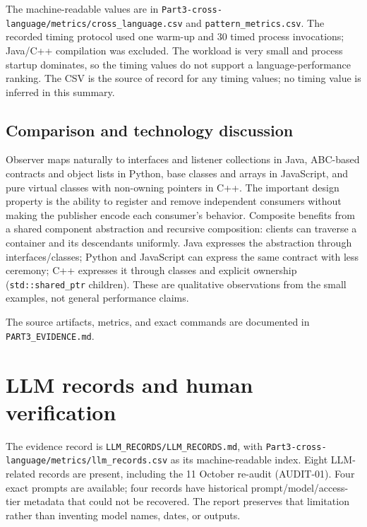 \documentclass[11pt,a4paper]{article}
\newcommand{\code}[1]{\nolinkurl{#1}}
\begin{document}
The machine-readable values are in \code{Part3-cross-language/metrics/cross_language.csv} and \code{pattern_metrics.csv}. The recorded timing protocol used one warm-up and 30 timed process invocations; Java/C++ compilation was excluded. The workload is very small and process startup dominates, so the timing values do not support a language-performance ranking. The CSV is the source of record for any timing values; no timing value is inferred in this summary.

\subsection{Comparison and technology discussion}
Observer maps naturally to interfaces and listener collections in Java, ABC-based contracts and object lists in Python, base classes and arrays in JavaScript, and pure virtual classes with non-owning pointers in C++. The important design property is the ability to register and remove independent consumers without making the publisher encode each consumer's behavior. Composite benefits from a shared component abstraction and recursive composition: clients can traverse a container and its descendants uniformly. Java expresses the abstraction through interfaces/classes; Python and JavaScript can express the same contract with less ceremony; C++ expresses it through classes and explicit ownership (\code{std::shared_ptr} children). These are qualitative observations from the small examples, not general performance claims.

The source artifacts, metrics, and exact commands are documented in \code{PART3_EVIDENCE.md}.

\section{LLM records and human verification}

The evidence record is \code{LLM_RECORDS/LLM_RECORDS.md}, with \code{Part3-cross-language/metrics/llm_records.csv} as its machine-readable index. Eight LLM-related records are present, including the 11 October re-audit (AUDIT-01). Four exact prompts are available; four records have historical prompt/model/access-tier metadata that could not be recovered. The report preserves that limitation rather than inventing model names, dates, or outputs.
\end{document}
